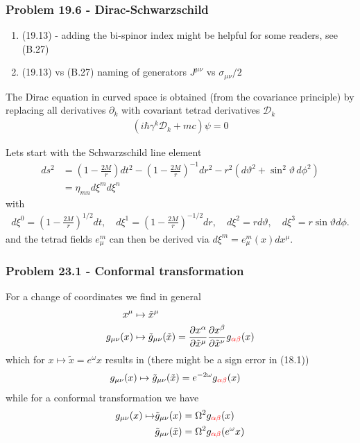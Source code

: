 \documentclass[10pt,a4paper]{book}
\theoremstyle{definition}
\begin{document}
\subsubsection{Problem 19.6 - Dirac-Schwarzschild}
\begin{enumerate}
    \item (19.13) - adding the bi-spinor index might be helpful for some readers, see (B.27)
    \item (19.13) vs (B.27) naming of generators $J^{\mu\nu}$ vs $\sigma_{\mu\nu}/2$
\end{enumerate}
The Dirac equation in curved space is obtained (from the covariance principle) by replacing all derivatives $\partial_k$ with covariant tetrad derivatives $\mathscr{D}_k$ 
\begin{align}
    (i\hbar\gamma^k\mathscr{D}_k+mc)\psi=0
\end{align}




Lets start with the Schwarzschild line element
\begin{align}
    ds^2&=\left(1-\frac{2M}{r}\right)dt^2-\left(1-\frac{2M}{r}\right)^{-1}dr^2-r^2(d\vartheta^2+\sin^2\vartheta\,d\phi^2)\\
    &=\eta_{mn}d\xi^md\xi^n
\end{align}
with
\begin{align}
    d\xi^0=\left(1-\frac{2M}{r}\right)^{1/2}dt,\quad d\xi^1=\left(1-\frac{2M}{r}\right)^{-1/2}dr,\quad d\xi^2=rd\vartheta,\quad d\xi^3=r\sin\vartheta d\phi.
\end{align}
and the tetrad fields $e^m_\mu$ can then be derived via $d\xi^m=e^m_\mu(x) dx^\mu$.



\subsubsection{Problem 23.1 - Conformal transformation}
For a change of coordinates we find in general
\begin{align}
    x^\mu&\mapsto\tilde{x}^\mu\\
    g_{\mu\nu}(x)&\mapsto\tilde{g}_{\mu\nu}(\tilde{x})=\frac{\partial x^\alpha}{\partial \tilde x^\mu}\frac{\partial x^\beta}{\partial \tilde x^\nu}g_{\textcolor{red}{\alpha\beta}}(x)
\end{align}
which for $x\mapsto\tilde{x}=e^{\omega}x$ results in (there might be a sign error in (18.1))
\begin{align}
    g_{\mu\nu}(x)&\mapsto\tilde{g}_{\mu\nu}(\tilde{x})=e^{-2\omega}g_{\textcolor{red}{\alpha\beta}}(x)
\end{align}
while for a conformal transformation we have 
\begin{align}
    g_{\mu\nu}(x)\mapsto &\tilde{g}_{\mu\nu}(x)=\Omega^2g_{\textcolor{red}{\alpha\beta}}(x)\\
    &\tilde{g}_{\mu\nu}(\tilde{x})=\Omega^2g_{\textcolor{red}{\alpha\beta}}(e^{\omega}x)
\end{align}
\end{document}
